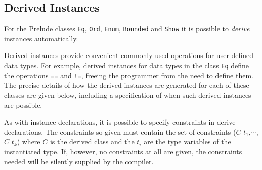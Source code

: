 \subsection{Derived Instances} \label{derivedcl}

For the Prelude classes \texttt{Eq}, \texttt{Ord}, \texttt{Enum}, \texttt{Bounded} and \texttt{Show} it is possible to \emph{derive} instances automatically.

\begin{flushleft}
       
\end{flushleft}

Derived instances provide convenient commonly-used operations for user-defined data types.
For example, derived instances for data types in the class \texttt{Eq} define the operations \texttt{==} and \texttt{!=}, freeing the programmer from the need to define them. The precise details of how
the derived instances are generated for each of these classes are given below,
including a specification of when such derived instances are possible.


As with instance declarations, it is possible to specify constraints in derive declarations. The constraints so given must contain the set of constraints  ($C$ $t_1$,$\cdots$, $C$ $t_k$) where $C$ is the derived class and  the $t_i$ are the type variables of the instantiated type. If, however, no constraints at all are given, the constraints needed will be silently supplied by the compiler.

